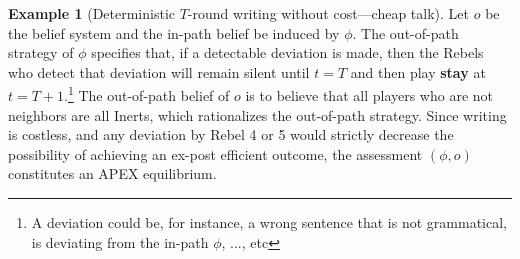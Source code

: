 \documentclass[12pt,letter]{article}
\newcommand\omicron{o}
\theoremstyle{definition}
\newtheorem{example}{Example}
\theoremstyle{remark}
\theoremstyle{claim}
\begin{document}
\begin{example}[Deterministic $T$-round writing without cost---cheap talk]
Let $\omicron$ be the belief system and the in-path belief be induced by $\phi$. The out-of-path strategy of $\phi$ specifies that, if a detectable deviation is made, then the Rebels who detect that deviation will remain silent until $t=T$ and then play \textbf{stay} at $t=T+1$.\footnote{A deviation could be, for instance, a wrong sentence that is not grammatical, is deviating from the in-path $\phi$, ..., etc} 
The out-of-path belief of $\omicron$ is to believe that all players who are not neighbors are all Inerts, which rationalizes the out-of-path strategy. Since writing is costless, and any deviation by Rebel 4 or 5 would strictly decrease the possibility of achieving an ex-post efficient outcome, the assessment $(\phi,\omicron)$ constitutes an APEX equilibrium.

\end{example}


%
\end{document}
